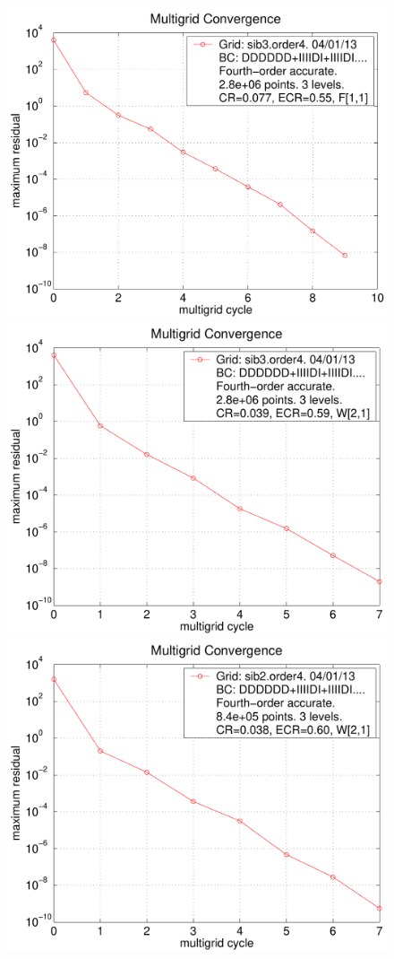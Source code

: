 \documentclass{article}
\begin{document}
\begin{figure}
\begin{center}
\includegraphics[width=\figWidth]{fig/residual-sib3-order4-F11}
\includegraphics[width=\figWidth]{fig/residual-sib3-order4-W21}
\includegraphics[width=\figWidth]{fig/residual-sib2-order4}

\end{center}
\end{figure}
\end{document}
